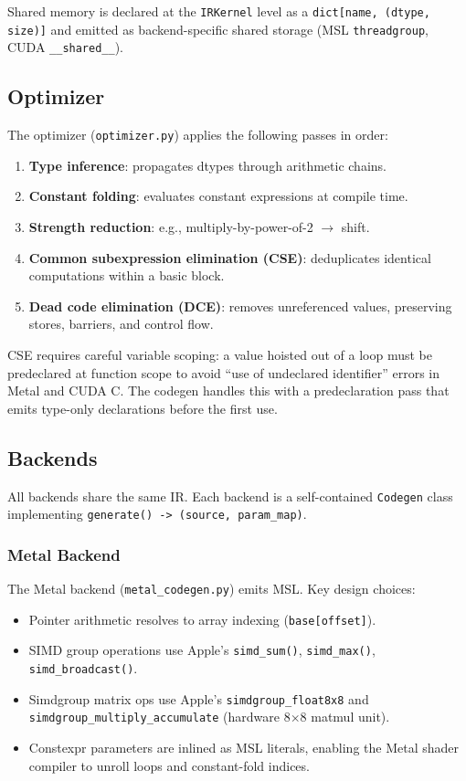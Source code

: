 \documentclass[10pt,twocolumn]{article}
\begin{document}
Shared memory is declared at the \texttt{IRKernel} level as a
\texttt{dict[name, (dtype, size)]} and emitted as backend-specific shared
storage (MSL \texttt{threadgroup}, CUDA \texttt{\_\_shared\_\_}).

\subsection{Optimizer}

The optimizer (\texttt{optimizer.py}) applies the following passes in order:

\begin{enumerate}[noitemsep]
  \item \textbf{Type inference}: propagates dtypes through arithmetic chains.
  \item \textbf{Constant folding}: evaluates constant expressions at compile time.
  \item \textbf{Strength reduction}: e.g., multiply-by-power-of-2 $\to$ shift.
  \item \textbf{Common subexpression elimination (CSE)}: deduplicates identical
        computations within a basic block.
  \item \textbf{Dead code elimination (DCE)}: removes unreferenced values,
        preserving stores, barriers, and control flow.
\end{enumerate}

CSE requires careful variable scoping: a value hoisted out of a loop must be
predeclared at function scope to avoid ``use of undeclared identifier'' errors
in Metal and CUDA C. The codegen handles this with a predeclaration pass that
emits type-only declarations before the first use.

\subsection{Backends}

All backends share the same IR. Each backend is a self-contained
\texttt{Codegen} class implementing \texttt{generate() -> (source, param\_map)}.

\subsubsection{Metal Backend}

The Metal backend (\texttt{metal\_codegen.py}) emits MSL. Key design choices:
\begin{itemize}[noitemsep]
  \item Pointer arithmetic resolves to array indexing (\texttt{base[offset]}).
  \item SIMD group operations use Apple's \texttt{simd\_sum()},
        \texttt{simd\_max()}, \texttt{simd\_broadcast()}.
  \item Simdgroup matrix ops use Apple's \texttt{simdgroup\_float8x8} and
        \texttt{simdgroup\_multiply\_accumulate} (hardware 8$\times$8 matmul unit).
  \item Constexpr parameters are inlined as MSL literals, enabling the Metal
        shader compiler to unroll loops and constant-fold indices.
\end{itemize}
\end{document}
